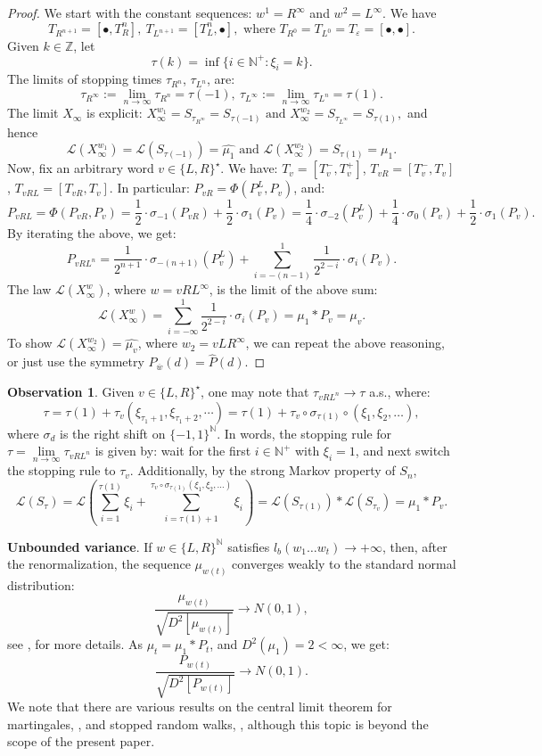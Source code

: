 \documentclass[10pt]{amsart}
\theoremstyle{definition}
\newtheorem{observation}[theorem]{Observation}
\numberwithin{equation}{section}
\newcommand{\eps}{\varepsilon}
\newcommand{\N}{\mathbb{N}}
\newcommand{\Z}{\mathbb{Z}}
\newcommand{\LL}{\mathcal{L}}
\begin{document}
\begin{proof}
 We start with the constant sequences:  $w^1=R^{\infty}$ and $w^2=L^{\infty}$. We have 
$$T_{R^{n+1}}=[\bullet, T_R^n],\ T_{L^{n+1}}=[ T_L^n,\bullet],\mbox{ where }T_{R^0}=T_{L^0}=T_{\eps}=[\bullet,\bullet]. $$
Given $k\in\Z$, let 
$$\tau(k)=\inf\{i\in\N^+\colon \xi_i=k\}.$$ The limits of stopping times $\tau_{R^n}$, $\tau_{L^n}$, are:
$$\tau_{R^{\infty}}:=\lim\limits_{n\to\infty}\tau_{R^n}=\tau(-1),\ \tau_{L^{\infty}}:=\lim\limits_{n\to\infty}\tau_{L^n}=\tau(1).$$
 The limit $X_\infty$ is explicit: $ X_\infty^{w_1}=S_{\tau_{R^{\infty}}}=S_{\tau(-1)}\mbox{ and }X_\infty^{w_2}=S_{\tau_{L^{\infty}}}=S_{\tau(1)},$
and hence
$$\LL( X_{\infty}^{w_1})=\LL(S_{\tau(-1)})=\hat{\mu_1}\mbox{ and }\LL( X_{\infty}^{w_2})=S_{\tau(1)}=\mu_1.$$
Now, fix an arbitrary word $v\in\{L,R\}^{\star}$. We have: $T_v=[T_v^-,T_v^+]$,  $T_{vR}=[T_v^-,T_v]$, $T_{vRL}=[ T_{vR} ,T_v]$. In particular: $P_{vR}=\Phi(P_v^L,P_v)$, and:
$$P_{vRL}=\Phi(P_{vR},P_v)=\frac12\cdot \sigma_{-1}(P_{vR}) + \frac12\cdot \sigma_{1}(P_v)=\frac14\cdot \sigma_{-2}(P_v^L) + \frac14\cdot \sigma_{0}(P_{v}) + \frac12\cdot \sigma_{1}(P_{v}).$$
By iterating the above, we get:
\begin{equation}\label{iterating}
P_{vRL^n}=\frac{1}{2^{n+1}}\cdot \sigma_{-(n+1)}(P_v^L) + \sum\limits_ {i=-(n-1)}^1  \frac{1}{2^{2-i}}\cdot \sigma_{i}(P_v).
\end{equation}
  The  law  $\LL(X^w_{\infty})$, where $w=vRL^{\infty}$,  is the limit of the above sum:
$$\LL(X^w_{\infty})=\sum\limits_{i=-\infty}^{1} \frac{1}{2^{2-i}}\cdot \sigma_{i}(P_v)=\mu_1 * P_{v}=\mu_{v}.$$
To show $\LL(X_{\infty}^{w_2})=\hat{\mu_{v}}$, where $w_2=vLR^{\infty}$, we can repeat the above reasoning, or just use the symmetry $P_{\overline{w}}(d)=\hat{P}(d)$.
\end{proof}
\begin{observation} Given  $v\in\{L,R\}^\star$, one may note that $\tau_{vRL^n}\to \tau$ a.s., where:
$$\tau = \tau(1) +  \tau_v(\xi_{\tau_1+1},\xi_{\tau_1+2},\cdots)=\tau(1)+\tau_v\circ \sigma_{\tau(1)}\circ (\xi_1,\xi_2,\dots),$$
where $\sigma_{d}$ is the right shift on $\{-1,1\}^\N$. In words, the stopping rule for $\tau=\lim\limits_{n\to\infty}\tau_{vRL^n}$ is  given by: wait for the first $i\in\N^+$ with $\xi_i=1$, and next 
switch the stopping rule to $\tau_v$. Additionally, by the strong Markov property of $S_n$, 
$$\LL(S_{\tau})=\LL\left(\sum\limits_{i=1}^{\tau(1)}\xi_i+\sum\limits_{i=\tau(1)+1}^{ \tau_v\circ \sigma_{\tau(1)}(\xi_1,\xi_2,\dots)}\xi_i\right)=\LL(S_{\tau(1)}) \ast \LL( S_{\tau_{v}})=\mu_1\ast P_{v}.$$
\end{observation}
\textbf{Unbounded variance}. If $w\in\{L,R\}^\N$ satisfies $l_b(w_1\dots w_t)\to+\infty$, then, after the renormalization, the sequence $\mu_{w(t)}$ converges weakly to the standard normal distribution:
 $$\frac{\mu_{w(t)}}{\sqrt{D^2[\mu_{w(t)}]}}\to N(0,1),$$
 see \cite{sw2023}, \cite{Hosten} for more details. As $\mu_t=\mu_1\ast P_t$, and $D^2(\mu_1)=2<\infty$, we get: 
$$\frac{P_{w(t)}}{\sqrt{D^2[P_{w(t)}]}}\to N(0,1).$$
We note that there are various results on the central limit theorem for martingales, \cite{Hall}, and stopped random walks, \cite{Gut}, although this topic is beyond the scope of the present paper.
\end{document}
